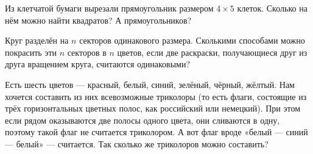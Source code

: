 ﻿
\begin{enumerate}
\itA Из клетчатой бумаги вырезали прямоугольник размером $4 \times 5$ клеток. Сколько на нём можно найти квадратов? А прямоугольников?

\itB Круг разделён на $n$ секторов одинакового размера. Сколькими способами можно покрасить эти $n$ секторов в $n$ цветов, если две раскраски, получающиеся друг из друга вращением круга, считаются одинаковыми?

\itC Есть шесть цветов — красный, белый, синий, зелёный, чёрный, жёлтый. Нам хочется составить из них всевозможные триколоры (то есть флаги, состоящие из трёх горизонтальных цветных полос, как российский или немецкий). При этом если рядом оказываются две полосы одного цвета, они сливаются в одну, поэтому такой флаг не считается триколором. А вот флаг вроде «белый — синий — белый» — считается. Так сколько же триколоров можно составить?
\end{enumerate}